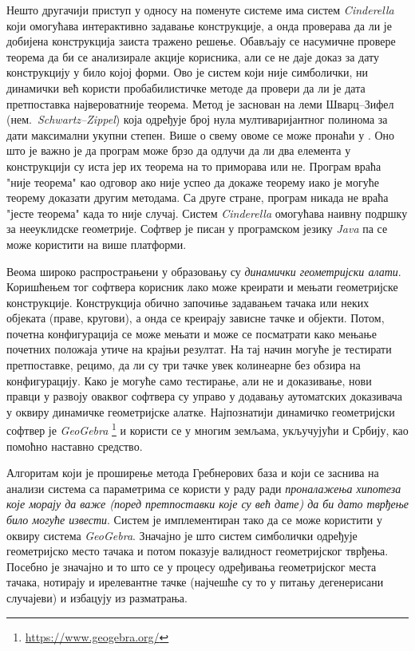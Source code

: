 Нешто другачији приступ у односу на поменуте системе има систем
\emph{Cinderella} \cite{kortenkamp2004using} који омогућава
интерактивно задавање конструкције, а онда проверава да ли је добијена
конструкција заиста тражено решење. Обављају се насумичне провере
теорема да би се анализирале акције корисника, али се не даје доказ за
дату конструкцију у било којој форми. Ово је систем који није
симболички, ни динамички већ користи пробабилистичке методе да провери
да ли је дата претпоставка највероватније теорема. Метод је заснован
на леми Шварц--Зифел (нем.~\emph{Schwartz--Zippel}) која одређује број
нула мултиваријантног полинома за дати максимални укупни степен. Више
о свему овоме се може пронаћи у \cite{richter1999foundations}. Оно што
је важно је да програм може брзо да одлучи да ли два елемента у
конструкцији су иста јер их теорема на то приморава или не. Програм
враћа "није теорема" као одговор ако није успео да докаже теорему иако
је могуће теорему доказати другим методама. Са друге стране, програм
никада не враћа "јесте теорема" када то није случај. Систем
\emph{Cinderella} омогућава наивну подршку за нееуклидске
геометрије. Софтвер је писан у програмском језику \emph{Java} па се
може користити на више платформи.

Веома широко распрострањени у образовању су \emph{динамички
  геометријски алати}. Коришћењем тог софтвера корисник лако може
креирати и мењати геометријске конструкције. Конструкција обично
започиње задавањем тачака или неких објеката (праве, кругови), а онда
се креирају зависне тачке и објекти. Потом, почетна конфигурација се
може мењати и може се посматрати како мењање почетних положаја утиче
на крајњи резултат. На тај начин могуће је тестирати претпоставке,
рецимо, да ли су три тачке увек колинеарне без обзира на
конфигурацију. Како је могуће само тестирање, али не и доказивање,
нови правци у развоју оваквог софтвера су управо у додавању
аутоматских доказивача у оквиру динамичке геометријске
алатке. Најпознатији динамичко геометријски софтвер је
\emph{GeoGebra} \footnote{\url{https://www.geogebra.org/}} и користи
се у многим земљама, укључујући и Србију, као помоћно наставно
средство.

Алгоритам који је проширење метода Гребнерових база и који се заснива
на анализи система са параметрима се користи у раду
\cite{botana2014automatic} ради \emph{проналажења хипотеза које морају
  да важе (поред претпоставки које су већ дате) да би дато тврђење
  било могуће извести}. Систем је имплементиран тако да се може
користити у оквиру система \emph{GeoGebra}. Значајно је што систем
симболички одређује геометријско место тачака и потом показује
валидност геометријског тврђења. Посебно је значајно и то што се у
процесу одређивања геометријског места тачака, нотирају и ирелевантне
тачке (најчешће су то у питању дегенерисани случајеви) и избацују из
разматрања.

